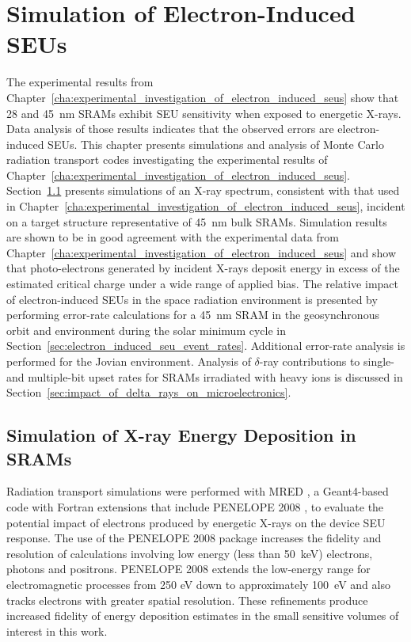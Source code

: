\chapter{Simulation of Electron-Induced SEUs} %
\label{ch:simulation_of_electron_induced_seus}
The experimental results from Chapter~\ref{cha:experimental_investigation_of_electron_induced_seus} show that 28 and 45~nm SRAMs exhibit SEU sensitivity when exposed to energetic X-rays. 
Data analysis of those results indicates that the observed errors are electron-induced SEUs.
This chapter presents simulations and analysis of Monte Carlo radiation transport codes investigating the experimental results of Chapter~\ref{cha:experimental_investigation_of_electron_induced_seus}.
Section~\ref{sec:simulation_of_x_ray_energy_deposition_in_srams} presents simulations of an X-ray spectrum, consistent with that used in Chapter~\ref{cha:experimental_investigation_of_electron_induced_seus}, incident on a target structure representative of 45~nm bulk SRAMs.
Simulation results are shown to be in good agreement with the experimental data from Chapter~\ref{cha:experimental_investigation_of_electron_induced_seus} and show that photo-electrons generated by incident X-rays deposit energy in excess of the estimated critical charge under a wide range of applied bias.
The relative impact of electron-induced SEUs in the space radiation environment is presented by performing error-rate calculations for a 45~nm SRAM in the geosynchronous orbit and environment during the solar minimum cycle in Section~\ref{sec:electron_induced_seu_event_rates}.
Additional error-rate analysis is performed for the Jovian environment.
Analysis of $\delta$-ray contributions to single- and multiple-bit upset rates for SRAMs irradiated with heavy ions is discussed in Section~\ref{sec:impact_of_delta_rays_on_microelectronics}.

\section{Simulation of X-ray Energy Deposition in SRAMs} %
\label{sec:simulation_of_x_ray_energy_deposition_in_srams}
Radiation transport simulations were performed with MRED \cite{Weller:2010ud}, a Geant4-based code \cite{Agostinelli:2003vd} with Fortran extensions that include PENELOPE 2008 \cite{Salvat:ue}, to evaluate the potential impact of electrons produced by energetic X-rays on the device SEU response. 
The use of the PENELOPE 2008 package \cite{Salvat:ue} increases the fidelity and resolution of calculations involving low energy (less than 50~keV) electrons, photons and positrons.
PENELOPE 2008 extends the low-energy range for electromagnetic processes from 250 eV down to approximately 100~eV and also tracks electrons with greater spatial resolution. 
These refinements produce increased fidelity of energy deposition estimates in the small sensitive volumes of interest in this work.%

